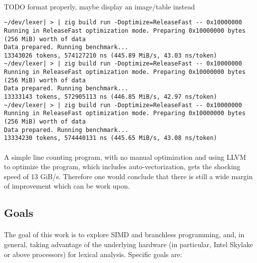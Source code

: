 \documentclass[12pt]{article}
\begin{document}
	\paragraph{}
	TODO format properly, maybe display an image/table instead
\begin{lstlisting}
~/dev/lexer| > | zig build run -Doptimize=ReleaseFast -- 0x10000000                                                                                                                      
Running in ReleaseFast optimization mode. Preparing 0x10000000 bytes (256 MiB) worth of data
Data prepared. Running benchmark...
13343026 tokens, 574127210 ns (445.89 MiB/s, 43.03 ns/token)
~/dev/lexer| > | zig build run -Doptimize=ReleaseFast -- 0x10000000                                                                                                                      
Running in ReleaseFast optimization mode. Preparing 0x10000000 bytes (256 MiB) worth of data
Data prepared. Running benchmark...
13333143 tokens, 572905113 ns (446.85 MiB/s, 42.97 ns/token)
~/dev/lexer| > | zig build run -Doptimize=ReleaseFast -- 0x10000000                                                                                                                      
Running in ReleaseFast optimization mode. Preparing 0x10000000 bytes (256 MiB) worth of data
Data prepared. Running benchmark...
13334230 tokens, 574440131 ns (445.65 MiB/s, 43.08 ns/token)
\end{lstlisting}
	\paragraph{}
	A simple line counting program, with no manual optimization and using LLVM to optimize the program, which includes auto-vectorization, gets the shocking speed of 13 GiB/s. Therefore one would conclude that there is still a wide margin of improvement which can be work upon.

	\subsection{Goals}
	
	\paragraph{}
	The goal of this work is to explore SIMD and branchless programming, and, in general, taking advantage of the underlying hardware (in particular, Intel Skylake or above processors) for lexical analysis.
	Specific goals are:
	
\end{document}
